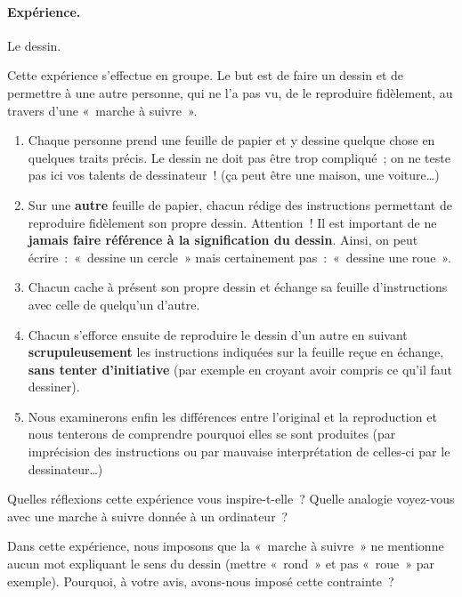 			\begin{Emphase}
				\paragraph{Expérience.} Le dessin.
				
				Cette expérience s’effectue en groupe.
				Le but est de faire un dessin 
				et de permettre à une autre personne, 
				qui ne l’a pas vu, 
				de le reproduire fidèlement, 
				au travers d’une «~marche à suivre~».
	
				\begin{enumerate}
				\item
					Chaque personne prend une feuille de papier et 
					y dessine quelque chose en quelques traits précis. 
					Le dessin ne doit pas être trop compliqué~; 
					on ne teste pas ici vos talents de dessinateur~! 
					(ça peut être une maison, une voiture\dots)
				\item
					Sur une \textbf{autre} feuille de papier, 
					chacun rédige des instructions permettant de 
					reproduire fidèlement son propre dessin. 
					Attention~! Il est important de ne
					\textbf{jamais faire référence à la signification du dessin}. 
					Ainsi, on peut écrire~:~«~dessine un cercle~» 
					mais certainement pas~:~«~dessine une roue~».
				\item
					Chacun cache à présent son propre dessin et échange 
					sa feuille d’instructions avec celle de quelqu’un d’autre.
				\item
					Chacun s’efforce ensuite 
					de reproduire le dessin d’un autre 
					en suivant \textbf{scrupuleusement} 
					les instructions indiquées sur la feuille reçue en échange, 
					\textbf{sans tenter d’initiative} 
					(par exemple en croyant avoir compris ce
					qu’il faut dessiner).
				\item
					Nous examinerons enfin les différences 
					entre l’original et la reproduction 
					et nous tenterons de comprendre 
					pourquoi elles se sont produites 
					(par imprécision des instructions 
					ou par mauvaise interprétation de celles-ci 
					par le dessinateur\dots)
				\end{enumerate}
			\end{Emphase}
	
			Quelles réflexions cette expérience vous inspire-t-elle~?
			Quelle analogie voyez-vous 
			avec une marche à suivre donnée à un ordinateur~?
	
			Dans cette expérience, 
			nous imposons que la «~marche à suivre~» 
			ne mentionne aucun mot expliquant le sens du dessin 
			(mettre «~rond~» et pas «~roue~» par exemple). 
			Pourquoi, à votre avis, avons-nous imposé cette contrainte~?
	

